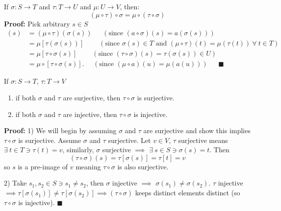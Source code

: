 \begin{lemma}
If $\sigma:S\rightarrow T$ and $\tau: T \rightarrow U$ and $\mu: U \rightarrow V$, then:
\begin{equation}
    (\mu\circ\tau)\circ \sigma = \mu \circ (\tau \circ \sigma)\nonumber
\end{equation}
\textbf{Proof:} Pick arbitrary $s\in S$\\
\begin{align}
    [(\mu\circ \tau)\circ \sigma](s)&= (\mu\circ\tau)(\sigma(s))\nonumber \ \ \ \ \ \ \ (\text{since }(a\circ\sigma) (s) = a(\sigma(s)))\\
    &= \mu[\tau(\sigma(s))]\nonumber \ \ \ \ \ \ \ \ \ \ (\text{since } \sigma(s)\in T \text{ and } (\mu \circ \tau)(t)= \mu(\tau(t)) \ \forall \ t \in T)\\
    &= \mu[\tau\circ\sigma(s)]\nonumber \ \ \ \ \ \ \ \ \ \ (\text{since }  (\tau \circ \sigma)(s)= \tau(\sigma(s))  \in U ) \\
    &= \mu\circ[\tau\circ\sigma(s)].\nonumber \  \ \ \ \ \ (\text{since }  (\mu\circ a)(u)= \mu(a(u))  )\ \ \ \ \ \ \ \blacksquare
\end{align}
\end{lemma}
\begin{lemma}
If $\sigma: S\rightarrow T$, $\tau: T\rightarrow V$
\begin{enumerate}
    \item if both $\sigma$ and $\tau$ are surjective, then $\tau \circ \sigma$ is surjective.
    \item if both $\sigma$ and $\tau$ are injective, then $\tau \circ \sigma$ is injective.
\end{enumerate}
\textbf{Proof:} 1) We will begin by assuming $\sigma$ and $\tau$ are surjective and show this implies $\tau \circ \sigma$ is surjective. Assume $\sigma$ and $\tau$ surjective. Let $v\in V$, $\tau$ surjective means $\exists \ t\in T \ni \tau(t)=v $, similarly, $\sigma$ surjective $\implies$ $\exists \ s\in S \ni \sigma(s)=t$. Then
\begin{equation}
    (\tau \circ \sigma)(s)=\tau[\sigma(s)]=\tau[t]=v\nonumber
\end{equation}
so $s$ is a pre-image of $v$ meaning $\tau\circ \sigma$ is also surjective.

2) Take $s_1,s_2\in S \ni s_1\neq s_2$, then $\sigma$ injective $\implies$ $\sigma(s_1)\neq\sigma(s_2)$. $\tau$ injective $\implies \tau[\sigma(s_1)]\neq \tau[\sigma(s_2)] \implies (\tau \circ \sigma)$ keeps distinct elements distinct (so $\tau \circ \sigma$ is injective). $\blacksquare$
\end{lemma}
